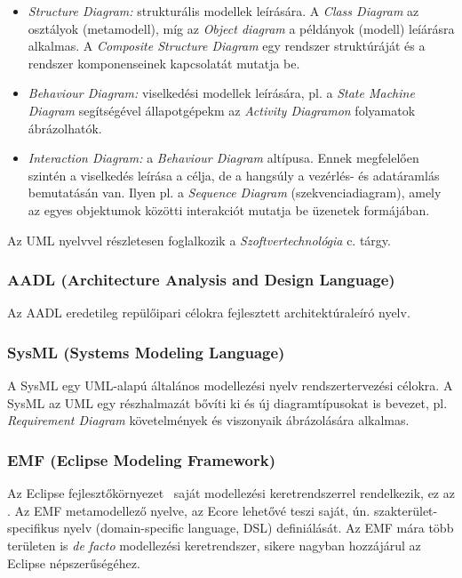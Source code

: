 \begin{itemize}
	\item \emph{Structure Diagram:} strukturális modellek leírására. A \emph{Class Diagram} az osztályok (metamodell), míg az \emph{Object diagram} a példányok (modell) leíárásra alkalmas. A \emph{Composite Structure Diagram} egy rendszer struktúráját és a rendszer komponenseinek kapcsolatát mutatja be.
	\item \emph{Behaviour Diagram:} viselkedési modellek leírására, pl. a \emph{State Machine Diagram} segítségével állapotgépekm az \emph{Activity Diagramon} folyamatok ábrázolhatók.
	\item \emph{Interaction Diagram:} a \emph{Behaviour Diagram} altípusa. Ennek megfelelően szintén a viselkedés leírása a célja, de a hangsúly a vezérlés- és adatáramlás bemutatásán van. Ilyen pl. a \emph{Sequence Diagram} (szekvenciadiagram), amely az egyes objektumok közötti interakciót mutatja be üzenetek formájában.
\end{itemize}


Az UML nyelvvel részletesen foglalkozik a \emph{Szoftvertechnológia} c. tárgy.

\subsubsection{AADL (Architecture Analysis and Design Language)}

Az AADL eredetileg repülőipari célokra fejlesztett architektúraleíró nyelv.

\subsubsection{SysML (Systems Modeling Language)}

A SysML egy UML-alapú általános modellezési nyelv rendszertervezési célokra. A SysML az UML egy részhalmazát bővíti ki és új diagramtípusokat is bevezet, pl. \emph{Requirement Diagram} követelmények és viszonyaik ábrázolására alkalmas.

\subsubsection{EMF (Eclipse Modeling Framework)}

Az Eclipse fejlesztőkörnyezet~\cite{eclipse} saját modellezési keretrendszerrel rendelkezik, ez az . Az EMF metamodellező nyelve, az Ecore lehetővé teszi saját, ún. szakterület-specifikus nyelv (domain-specific language, DSL) definiálását. Az EMF mára több területen is \emph{de facto} modellezési keretrendszer, sikere nagyban hozzájárul az Eclipse népszerűségéhez.

